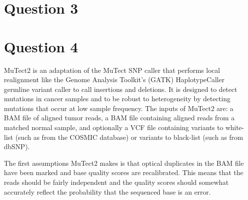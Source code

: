 \section{Question 3}


\section{Question 4}

MuTect2 \parencite{cibulskis_sensitive_2013} is an adaptation of the MuTect SNP caller that performs local realignment like the Genome Analysis Toolkit's (GATK) HaplotypeCaller germline variant caller to call insertions and deletions. It is designed to detect mutations in cancer samples and to be robust to heterogeneity by detecting mutations that occur at low sample frequency. The inputs of MuTect2 are: a BAM file of aligned tumor reads, a BAM file containing aligned reads from a matched normal sample, and optionally a VCF file containing variants to white-list (such as from the COSMIC database) or variants to black-list (such as from dbSNP). 

The first assumptions MuTect2 makes is that optical duplicates in the BAM file have been marked and base quality scores are recalibrated. This means that the reads should be fairly independent and the quality scores should somewhat accurately reflect the probability that the sequenced base is an error.


